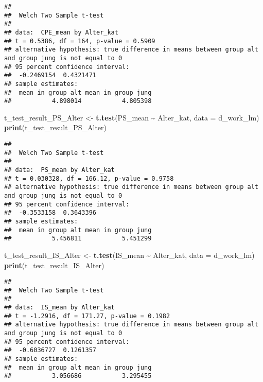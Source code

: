 \documentclass[
]{article}
\newenvironment{Shaded}{\begin{snugshade}}{\end{snugshade}}
\newcommand{\AttributeTok}[1]{\textcolor[rgb]{0.13,0.29,0.53}{#1}}
\newcommand{\FunctionTok}[1]{\textcolor[rgb]{0.13,0.29,0.53}{\textbf{#1}}}
\newcommand{\NormalTok}[1]{#1}
\newcommand{\OtherTok}[1]{\textcolor[rgb]{0.56,0.35,0.01}{#1}}
\newcommand{\SpecialCharTok}[1]{\textcolor[rgb]{0.81,0.36,0.00}{\textbf{#1}}}
\begin{document}
\begin{verbatim}
## 
##  Welch Two Sample t-test
## 
## data:  CPE_mean by Alter_kat
## t = 0.5386, df = 164, p-value = 0.5909
## alternative hypothesis: true difference in means between group alt and group jung is not equal to 0
## 95 percent confidence interval:
##  -0.2469154  0.4321471
## sample estimates:
##  mean in group alt mean in group jung 
##           4.898014           4.805398
\end{verbatim}

\begin{Shaded}
\begin{Highlighting}[]
\NormalTok{t\_test\_result\_PS\_Alter }\OtherTok{\textless{}{-}} \FunctionTok{t.test}\NormalTok{(PS\_mean }\SpecialCharTok{\textasciitilde{}}\NormalTok{ Alter\_kat, }\AttributeTok{data =}\NormalTok{ d\_work\_lm)}
\FunctionTok{print}\NormalTok{(t\_test\_result\_PS\_Alter)}
\end{Highlighting}
\end{Shaded}

\begin{verbatim}
## 
##  Welch Two Sample t-test
## 
## data:  PS_mean by Alter_kat
## t = 0.030328, df = 166.12, p-value = 0.9758
## alternative hypothesis: true difference in means between group alt and group jung is not equal to 0
## 95 percent confidence interval:
##  -0.3533158  0.3643396
## sample estimates:
##  mean in group alt mean in group jung 
##           5.456811           5.451299
\end{verbatim}

\begin{Shaded}
\begin{Highlighting}[]
\NormalTok{t\_test\_result\_IS\_Alter }\OtherTok{\textless{}{-}} \FunctionTok{t.test}\NormalTok{(IS\_mean }\SpecialCharTok{\textasciitilde{}}\NormalTok{ Alter\_kat, }\AttributeTok{data =}\NormalTok{ d\_work\_lm)}
\FunctionTok{print}\NormalTok{(t\_test\_result\_IS\_Alter)}
\end{Highlighting}
\end{Shaded}

\begin{verbatim}
## 
##  Welch Two Sample t-test
## 
## data:  IS_mean by Alter_kat
## t = -1.2916, df = 171.27, p-value = 0.1982
## alternative hypothesis: true difference in means between group alt and group jung is not equal to 0
## 95 percent confidence interval:
##  -0.6036727  0.1261357
## sample estimates:
##  mean in group alt mean in group jung 
##           3.056686           3.295455
\end{verbatim}
\end{document}
